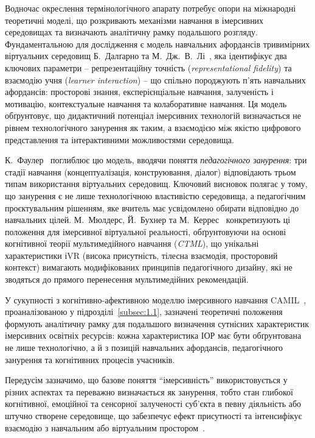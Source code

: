 Водночас окреслення термінологічного апарату потребує опори на міжнародні теоретичні моделі, що розкривають механізми навчання в імерсивних середовищах та визначають аналітичну рамку подальшого розгляду. Фундаментальною для дослідження є модель навчальних афордансів тривимірних віртуальних середовищ Б.~Далґарно та М.~Дж.~В.~Лі~\cite{Dalgarno2010What}, яка ідентифікує два ключових параметри -- репрезентаційну точність (\emph{representational fidelity}) та взаємодію учня (\emph{learner interaction}) -- що спільно породжують п'ять навчальних афордансів: просторові знання, експерієнціальне навчання, залученість і мотивацію, контекстуальне навчання та колаборативне навчання. Ця модель обґрунтовує, що дидактичний потенціал імерсивних технологій визначається не рівнем технологічного занурення як таким, а взаємодією між якістю цифрового представлення та інтерактивними можливостями середовища.

К.~Фаулер~\cite{Fowler2015Pedagogy} поглиблює цю модель, вводячи поняття \emph{педагогічного занурення}: три стадії навчання (концептуалізація, конструювання, діалог) відповідають трьом типам використання віртуальних середовищ. Ключовий висновок полягає у тому, що занурення є не лише технологічною властивістю середовища, а педагогічним проєктувальним рішенням, яке вчитель має усвідомлено обирати відповідно до навчальних цілей. М.~Мюлдерс, Й.~Бухнер та М.~Керрес~\cite{Mulders2020Framework} конкретизують ці положення для імерсивної віртуальної реальності, обґрунтовуючи на основі когнітивної теорії мультимедійного навчання (\emph{CTML}), що унікальні характеристики іVR (висока присутність, тілесна взаємодія, просторовий контекст) вимагають модифікованих принципів педагогічного дизайну, які не зводяться до прямого перенесення мультимедійних рекомендацій.

У сукупності з когнітивно-афективною моделлю імерсивного навчання CAMIL~\cite{Makransky2021CAMIL}, проаналізованою у підрозділі~\ref{subsec:1.1}, зазначені теоретичні положення формують аналітичну рамку для подальшого визначення сутнісних характеристик імерсивних освітніх ресурсів: кожна характеристика ІОР має бути обґрунтована не лише технологічно, а й з позицій навчальних афордансів, педагогічного занурення та когнітивних процесів учасників.

Передусім зазначимо, що базове поняття ``імерсивність'' використовується у різних аспектах та переважно визначається як занурення, тобто стан глибокої когнітивної, емоційної та сенсорної залученості суб'єкта в певну діяльність або штучно створене середовище, що забезпечує ефект присутності та інтенсифікує взаємодію з навчальним або віртуальним простором~\cite{Semerikov2023Presence}.

